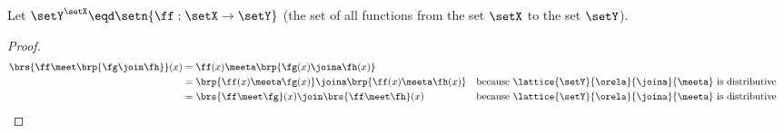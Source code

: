\begin{theorem}
\label{thm:lat_Y_YX}
Let $\setY^\setX \eqd \setn{\ff:\setX\to\setY}$
(the set of all functions from the set $\setX$ to the set $\setY$).
\end{theorem}
\begin{proof}
\begin{align*}
  \brs{\ff\meet\brp{\fg\join\fh}}(x)
    &= \ff(x)\meeta\brp{\fg(x)\joina\fh(x)}
  \\&= \brp{\ff(x)\meeta\fg(x)} \joina \brp{\ff(x)\meeta\fh(x)}
    && \text{because $\lattice{\setY}{\orela}{\joina}{\meeta}$ is distributive}
  \\&= \brs{\ff\meet\fg}(x) \join \brs{\ff\meet\fh}(x)
    && \text{because $\lattice{\setY}{\orela}{\joina}{\meeta}$ is distributive}
\end{align*}
\end{proof}




